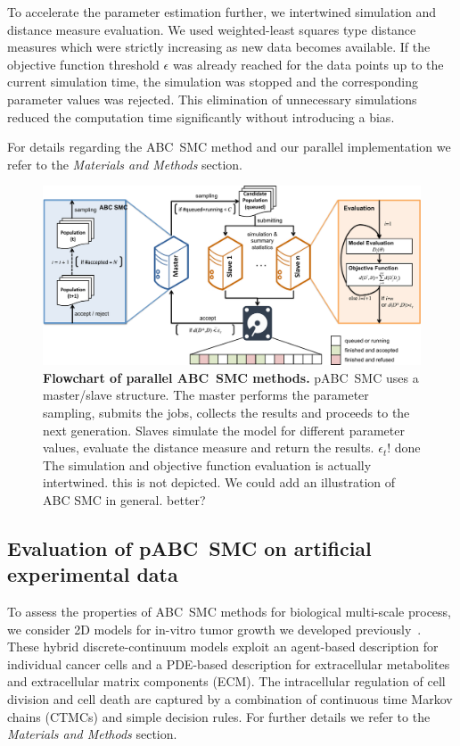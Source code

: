 \documentclass[10pt,letterpaper]{article}
\newcommand{\jh}[1]{{\color{red}#1}}
\newcommand{\nj}[1]{{\color{blue}#1}}
\begin{document}
To accelerate the parameter estimation further, we intertwined simulation and distance measure evaluation. We used weighted-least squares type distance measures which were strictly increasing as new data becomes available. If the objective function threshold $\epsilon$ was already reached for the data points up to the current simulation time, the simulation was stopped and the corresponding parameter values was rejected. This elimination of unnecessary simulations reduced the computation time significantly without introducing a bias.

For details regarding the ABC~SMC method and our parallel implementation we refer to the \textit{Materials and Methods} section.

\begin{figure}[t]
\includegraphics[width=\textwidth]{Figures/Pipeline.pdf}
\caption{{\bf Flowchart of parallel ABC~SMC methods.}
pABC~SMC uses a master/slave structure. The master performs the parameter sampling, submits the jobs, collects the results and proceeds to the next generation. Slaves simulate the model for different parameter values, evaluate the distance measure and return the results.
\jh{$\epsilon_t$!} \nj{done}
\jh{The simulation and objective function evaluation is actually intertwined. this is not depicted.}
\jh{We could add an illustration of ABC SMC in general.}
\nj{better?}
}
\label{fig:Pipeline}
\end{figure}

\subsection*{Evaluation of pABC~SMC on artificial experimental data}

To assess the properties of ABC~SMC methods for biological multi-scale process, we consider 2D models for in-vitro tumor growth we developed previously~\cite{JagiellaMul2015}. These hybrid discrete-continuum models exploit an agent-based description for individual cancer cells and a PDE-based description for extracellular metabolites and extracellular matrix components (ECM). The intracellular regulation of cell division and cell death are captured by a combination of continuous time Markov chains (CTMCs) and simple decision rules. For further details we refer to the \textit{Materials and Methods} section.
\end{document}
